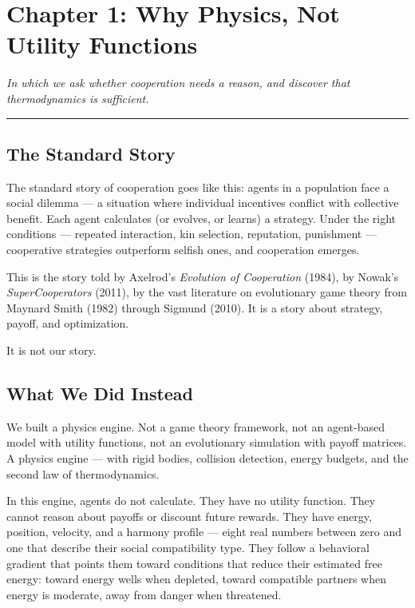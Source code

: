 \chapter{Chapter 1: Why Physics, Not Utility Functions}\label{chapter-1-why-physics-not-utility-functions}

\emph{In which we ask whether cooperation needs a reason, and discover that thermodynamics is sufficient.}

\begin{center}\rule{0.5\linewidth}{0.5pt}\end{center}

\section{The Standard Story}\label{the-standard-story}

The standard story of cooperation goes like this: agents in a population face a social dilemma --- a situation where individual incentives conflict with collective benefit. Each agent calculates (or evolves, or learns) a strategy. Under the right conditions --- repeated interaction, kin selection, reputation, punishment --- cooperative strategies outperform selfish ones, and cooperation emerges.

This is the story told by Axelrod's \emph{Evolution of Cooperation} (1984), by Nowak's \emph{SuperCooperators} (2011), by the vast literature on evolutionary game theory from Maynard Smith (1982) through Sigmund (2010). It is a story about strategy, payoff, and optimization.

It is not our story.

\section{What We Did Instead}\label{what-we-did-instead}

We built a physics engine. Not a game theory framework, not an agent-based model with utility functions, not an evolutionary simulation with payoff matrices. A physics engine --- with rigid bodies, collision detection, energy budgets, and the second law of thermodynamics.

In this engine, agents do not calculate. They have no utility function. They cannot reason about payoffs or discount future rewards. They have energy, position, velocity, and a harmony profile --- eight real numbers between zero and one that describe their social compatibility type. They follow a behavioral gradient that points them toward conditions that reduce their estimated free energy: toward energy wells when depleted, toward compatible partners when energy is moderate, away from danger when threatened.


